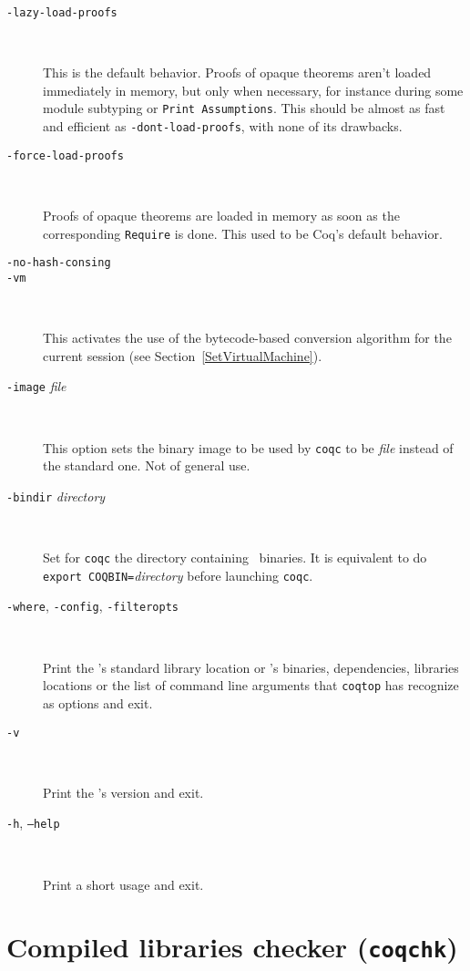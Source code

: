 \begin{description}
\item[{\tt -lazy-load-proofs}]\

  This is the default behavior. Proofs of opaque theorems aren't
  loaded immediately in memory, but only when necessary, for instance
  during some module subtyping or {\tt Print Assumptions}. This should be
  almost as fast and efficient as {\tt -dont-load-proofs}, with none
  of its drawbacks.

\item[{\tt -force-load-proofs}]\

  Proofs of opaque theorems are loaded in memory as soon as the
  corresponding {\tt Require} is done. This used to be Coq's default behavior.

\item[{\tt -no-hash-consing}] \mbox{}

\item[{\tt -vm}]\ 

  This activates the use of the bytecode-based conversion algorithm
  for the current session (see Section~\ref{SetVirtualMachine}).

\item[{\tt -image} {\em file}]\ 

  This option sets the binary image to be used by {\tt coqc} to be {\em file}
  instead of the standard one. Not of general use.

\item[{\tt -bindir} {\em directory}]\ 

  Set for {\tt coqc} the directory containing \Coq\ binaries.
  It is equivalent to do \texttt{export COQBIN=}{\em directory}
  before launching {\tt coqc}.

\item[{\tt -where}, {\tt -config}, {\tt -filteropts}]\ 

  Print the \Coq's standard library location or \Coq's binaries, dependencies,
  libraries locations or the list of command line arguments that {\tt coqtop} has
  recognize as options and exit.

\item[{\tt -v}]\ 

  Print the \Coq's version and exit.

\item[{\tt -h}, {\tt --help}]\ 

  Print a short usage and exit.

\end{description}


\section{Compiled libraries checker ({\tt coqchk})}

